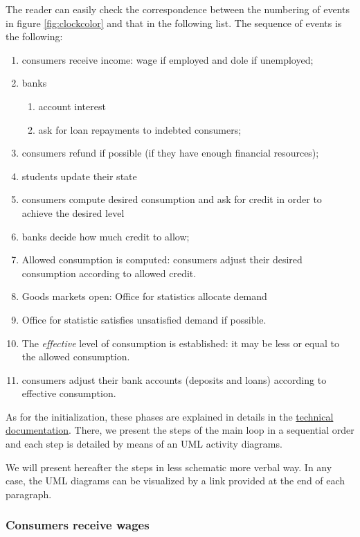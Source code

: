 \documentclass{book}
\newcommand{\doclocation}{file:///Users/giulioni/Documents/workspace/gabriele/docs}
\begin{document}
The reader can easily check the correspondence between the numbering of events in figure \ref{fig:clockcolor} and that in the following list. The sequence of events is the following:
\begin{enumerate}
	\item consumers receive income: wage if employed and dole if unemployed;
	\item banks 
		\begin{enumerate}
			\item account interest
			\item ask for loan repayments to indebted consumers;
		\end{enumerate}
	\item consumers refund if possible (if they have enough financial resources);
	\item students update their state
	\item consumers compute desired consumption and ask for credit in order to achieve the desired level 
	\item banks decide how much credit to allow;
	\item Allowed consumption is computed: consumers adjust their desired consumption according to allowed credit. 
	\item Goods markets open: Office for statistics allocate demand
	\item Office for statistic satisfies unsatisfied demand if possible.
	\item The \textit{effective} level of consumption is established: it may be less or equal to the allowed consumption.
	\item consumers adjust their bank accounts (deposits and loans) according to effective consumption.
\end{enumerate}

As for the initialization, these phases are explained in details in the \href{\doclocation/index_loop.html}{technical documentation}. There, we present the steps of the main loop in a sequential order and each step is detailed by means of an UML activity diagrams.

We will present hereafter the steps in less schematic more verbal way. In any case, the UML diagrams can be visualized by a link provided at the end of each paragraph.

\subsubsection{Consumers receive wages}
\end{document}
